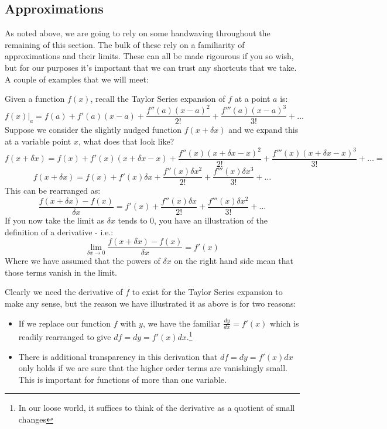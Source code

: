 \documentclass[../../Axiomathic.tex]{subfiles}
\begin{document}
\subsection{Approximations}
As noted above, we are going to rely on some handwaving throughout the remaining of this section. The bulk of these rely on a familiarity of approximations and their limits. These can all be made rigourous if you so wish, but for our purposes it's important that we can trust any shortcuts that we take. A couple of examples that we will meet:
\begin{example}
Given a function $f(x)$, recall the Taylor Series expansion of $f$ at a point $a$ is:
\[f(x)\vert_a = f(a)+f'(a)(x-a)+\frac{f''(a)(x-a)^2}{2!}+\frac{f'''(a)(x-a)^3}{3!}+\dots\]
Suppose we consider the slightly nudged function $f(x+\delta x)$ and we expand this at a variable point $x$, what does that look like?
\[f(x+\delta x)=f(x)+f'(x)(x+\delta x -x)+\frac{f''(x)(x+\delta x -x)^2}{2!}+\frac{f'''(x)(x+\delta x -x)^3}{3!}+\dots=\]
\[f(x+\delta x)=f(x)+f'(x)\delta x +\frac{f''(x)\delta x^2}{2!}+\frac{f'''(x)\delta x^3}{3!}+\dots\]
This can be rearranged as:
\[\frac{f(x+\delta x)-f(x)}{\delta x}=f'(x) +\frac{f''(x)\delta x}{2!}+\frac{f'''(x)\delta x^2}{3!}+\dots\]
If you now take the limit as $\delta x$ tends to 0, you have an illustration of the definition of a derivative - i.e.:
\[\lim_{\delta x \to 0} \frac{f(x+\delta x)-f(x)}{\delta x}=f'(x)\]
Where we have assumed that the powers of $\delta x$ on the right hand side mean that those terms vanish in the limit.
\end{example}
Clearly we need the derivative of $f$ to exist for the Taylor Series expansion to make any sense, but the reason we have illustrated it as above is for two reasons:
\begin{itemize}
\item{If we replace our function $f$ with $y$, we have the familiar $\frac{dy}{dx}=f'(x)$ which is readily rearranged to give $df=dy=f'(x)dx$.\footnote{In our loose world, it suffices to think of the derivative as a quotient of small changes}}
\item{There is additional transparency in this derivation that $df=dy=f'(x)dx$ only holds if we are sure that the higher order terms are vanishingly small. This is important for functions of more than one variable.}
\end{itemize}
\end{document}
